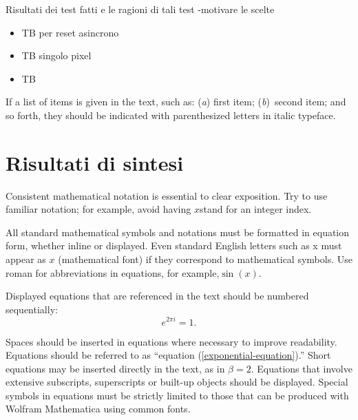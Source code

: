 \documentclass{article}
\begin{document}
Risultati  dei  test  fatti  e  le ragioni di tali test -motivare le scelte

\begin{itemize}
\item TB per reset asincrono
\item TB singolo pixel	 
\item TB 

\end{itemize}

If a list of items is given in the text, such as: (\textit{a}) first item; (\textit{b})~second item; and so forth, they should be indicated with parenthesized letters in italic typeface.

\section{Risultati di sintesi}

Consistent mathematical notation is essential to clear exposition. Try to use familiar notation; for example, avoid having \(x\)stand for an integer index.

All standard mathematical symbols and notations must be formatted in equation form, whether inline or displayed. Even standard English letters such as x must appear as \(x\) (mathematical font) if they correspond to mathematical symbols. Use roman for abbreviations in equations, for example,\(\sin (x)\).
%

Displayed equations that are referenced in the text should be numbered sequentially: 
\begin{equation}
e^{2\pi i}=1.
\label{exponential-equation}
\end{equation}

Spaces should be inserted in equations where necessary to improve readability. Equations should be referred to as {``}equation (\ref{exponential-equation}).{''} Short equations may be inserted directly in the text, as in \(\beta =2\). Equations that involve extensive subscripts, superscripts or built-up objects should be displayed. Special symbols in equations must be strictly limited to those that can be produced with Wolfram Mathematica using common fonts.
\end{document}
